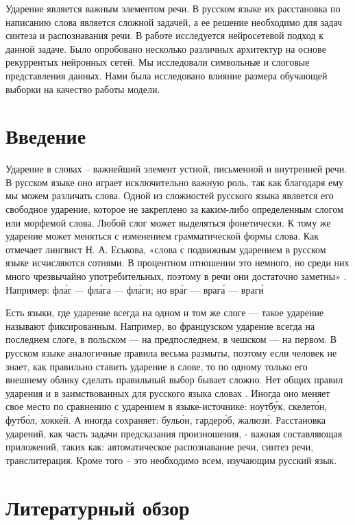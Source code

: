 \documentclass[14pt, a4paper, russian]{extreport}
\begin{document}
Ударение является важным элементом речи. В русском языке их расстановка по написанию слова является сложной задачей, а ее решение необходимо для задач синтеза и распознавания речи. В работе исследуется нейросетевой подход к данной задаче. Было опробовано несколько различных архитектур на основе рекуррентых нейронных сетей. Мы исследовали символьные и слоговые представления данных. Нами была исследовано влияние размера обучающей выборки на качество работы модели.


\tableofcontents{}


\chapter*{Введение}
Ударение в словах – важнейший элемент устной, письменной и внутренней речи. В русском языке оно играет исключительно важную роль, так как благодаря ему мы можем различать слова. Одной из сложностей русского языка является его свободное ударение, которое не закреплено за каким-либо определенным слогом или морфемой слова. Любой слог может выделяться фонетически. К тому же ударение  может меняться с изменением грамматической формы слова. Как отмечает лингвист Н. А. Еськова, «слова с подвижным ударением в русском языке исчисляются сотнями. В процентном отношении это немного, но среди них много чрезвычайно употребительных, поэтому в речи они достаточно заметны» \cite{eskina}. Например: фл\'{а}г — фл\'{а}га — фл\'{а}ги; но вр\'{а}г — враг\'{а} — враг\'{и} 

Есть языки, где ударение  всегда на одном и том же слоге — такое ударение называют фиксированным. Например, во французском ударение всегда на последнем слоге, в польском — на предпоследнем, в чешском — на первом. В русском языке аналогичные правила весьма размыты, поэтому если человек не знает, как правильно ставить ударение в слове, то по одному только его внешнему облику сделать правильный выбор бывает сложно.  Нет общих правил ударения и в заимствованных для русского языка словах . Иногда оно меняет свое место по сравнению с ударением в языке-источнике: ноутб\'{у}к, скелет\'{о}н, футб\'{о}л, хокк\'{е}й. А иногда сохраняет: буль\'{о}н, гардер\'{о}б, жалюз\'{и}.
Расстановка ударений, как часть задачи предсказания произношения, - важная составляющая  приложений, таких как: автоматическое распознавание речи, синтез речи, транслитерация. Кроме того – это необходимо всем, изучающим русский язык.


\newpage

\chapter{Литературный обзор}
\end{document}

